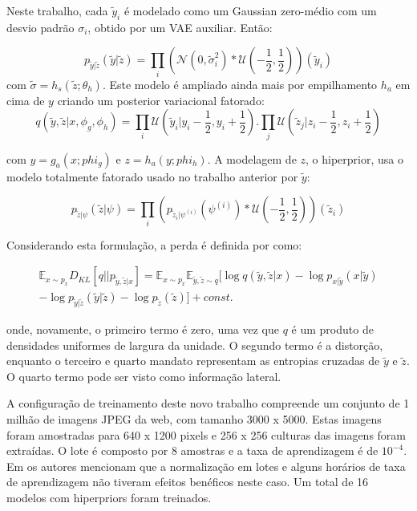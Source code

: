 Neste trabalho, cada $\tilde{y}_i$ é modelado como um Gaussian zero-médio com um desvio padrão $\sigma_i$, obtido por um VAE auxiliar. Então:

\begin{equation}
p_{\tilde{y}|\tilde{z}} (\tilde{y}|\tilde{z}) = \prod_{i}^{} (\mathcal{N}(0, \tilde{\sigma}_i^2) * \mathcal{U}(-\frac{1}{2}, \frac{1}{2}))(\tilde{y}_i)
\end{equation}
com $\tilde{\sigma} = h_s (\tilde{z}; \theta_h)$. Este modelo é ampliado ainda mais por empilhamento $h_a $ em cima de $y $ criando um posterior variacional fatorado:
\begin{equation}
q(\tilde{y},\tilde{z}|x, \phi_g, \phi_h) = \prod_{i}^{} \mathcal{U}(\tilde{y}_i | y_i - \frac{1}{2}, y_i + \frac{1}{2}) . \prod_{j}^{} \mathcal{U}(\tilde{z}_j | z_i - \frac{1}{2}, z_i + \frac{1}{2})
\end{equation}

com $y = g_a (x; phi_g)$ e $z = h_a (y; phi_h)$. A modelagem de $z$, o hiperprior, usa o modelo totalmente fatorado usado no trabalho anterior por $\tilde{y}$:

\begin{equation}
p_{\tilde{z} | \psi}(\tilde{z} | \psi) = \prod_{i}^{} (p_{\tilde{z}_i | \psi^{(i)}}(\psi^{(i)}) * \mathcal{U}(-\frac{1}{2}, \frac{1}{2}))(\tilde{z}_i)
\end{equation}


Considerando esta formulação, a perda é definida por \cite{Variational2018Balle} como:


\begin{equation}
\begin{aligned}
\mathbb{E}_{x \sim p_x} D_{KL}[q || p_{\tilde{y}, \tilde{z}|x}] = \mathbb{E}_{x \sim p_x} \mathbb{E}_{\tilde{y}, \tilde{z} \sim q}[\log q(\tilde{y}, \tilde{z}|x) - \log p_{x|\tilde{y}}(x|\tilde{y}) \\
- \log p_{\tilde{y} | \tilde{z}}(\tilde{y} | \tilde{z}) - \log p_{\tilde{z}}(\tilde{z})] + const.
\end{aligned}
\end{equation}

onde, novamente, o primeiro termo é zero, uma vez que $q$ é um produto de densidades uniformes de largura da unidade. O segundo termo é a distorção, enquanto o terceiro e quarto mandato representam as entropias cruzadas de $\tilde{y}$ e $\tilde{z}$. O quarto termo pode ser visto como informação lateral.

A configuração de treinamento deste novo trabalho compreende um conjunto de 1 milhão de imagens JPEG da web, com tamanho 3000 x 5000. Estas imagens foram amostradas para 640 x 1200 pixels e 256 x 256 culturas das imagens foram extraídas. O lote é composto por 8 amostras e a taxa de aprendizagem é de $10^{-4}$. Em \cite{Variational2018Balle} os autores mencionam que a normalização em lotes e alguns horários de taxa de aprendizagem não tiveram efeitos benéficos neste caso. Um total de 16 modelos com hiperpriors foram treinados.


